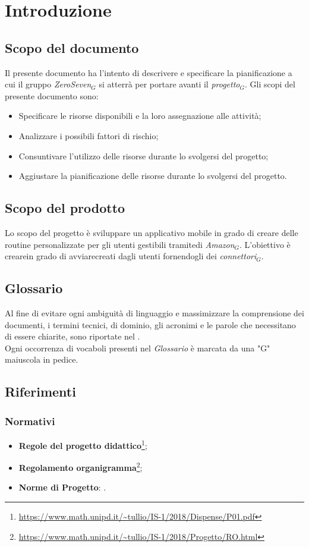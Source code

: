 \chapter{Introduzione}\label{Introduzione}
\section{Scopo del documento}
Il presente documento ha l'intento di descrivere e specificare la pianificazione a cui il gruppo \textit{ZeroSeven$_{G}$} si atterrà per portare avanti il \textit{progetto$_{G}$}.
Gli scopi del presente documento sono:
\begin{itemize}
	\item Specificare le risorse disponibili e la loro assegnazione alle attività;
	\item Analizzare i possibili fattori di rischio;
	\item Consuntivare l'utilizzo delle risorse durante lo svolgersi del progetto;
	\item Aggiustare la pianificazione delle risorse durante lo svolgersi del progetto.
\end{itemize}
\section{Scopo del prodotto}
Lo scopo del progetto è sviluppare un applicativo mobile in grado di creare delle routine personalizzate per gli utenti gestibili tramitedi \textit{Amazon$_{G}$}. L'obiettivo è crearein grado di avviarecreati dagli utenti fornendogli dei \textit{connettori$_{G}$}.
\section{Glossario}
Al fine di evitare ogni ambiguità di linguaggio e massimizzare la comprensione dei documenti, i termini tecnici, di dominio, gli acronimi e le parole che necessitano di essere chiarite, sono riportate nel \glossariodocumento.\\
Ogni occorrenza di vocaboli presenti nel \textit{Glossario} è marcata da una "G" maiuscola in pedice.
\section{Riferimenti}
\subsection{Normativi}
\label{normativi}
\begin{itemize}
	\item \textbf{Regole del progetto didattico}\footnote{\url{https://www.math.unipd.it/~tullio/IS-1/2018/Dispense/P01.pdf}};
	\item  \textbf{Regolamento organigramma}\footnote{\url{https://www.math.unipd.it/~tullio/IS-1/2018/Progetto/RO.html}};
	\item  \textbf{Norme di Progetto}: \normediprogetto.
\end{itemize}
